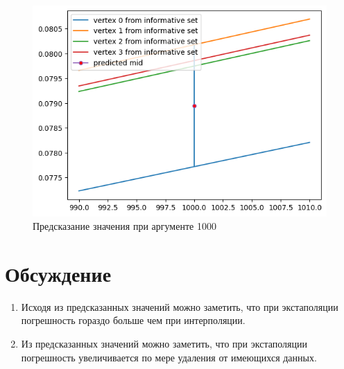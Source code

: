\documentclass[12pt,a4paper]{article}
\begin{document}
\begin{figure}[H]
    \centering
    \includegraphics[width=14cm]{4_6.png}
    \caption{Предсказание значения при аргументе 1000}
    \label{fig:info}
\end{figure}


\section{Обсуждение}
\begin{enumerate}
    \item Исходя из предсказанных значений можно заметить, что при экстаполяции погрешность гораздо больше чем при интерполяции.
    \item Из предсказанных значений можно заметить, что при экстаполяции погрешность увеличивается по мере удаления от имеющихся данных.
\end{enumerate}
\end{document}
